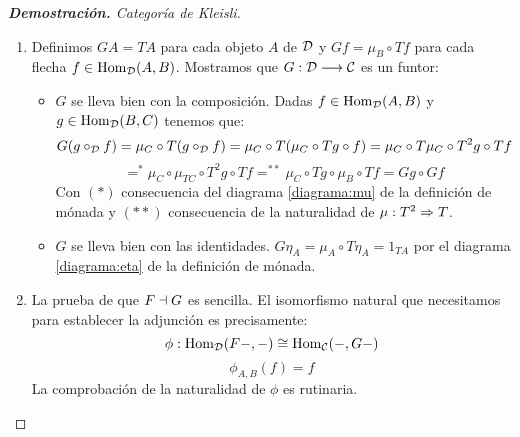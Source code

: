 \begin{proof}[\textbf{Demostración. } Categoría de Kleisli]
\begin{enumerate}
  \item Definimos $GA = TA$ para cada objeto $A$ de $\mathcal{D}$
    y $Gf = \mu_B \circ Tf$ para cada flecha $f \in \operatorname{Hom}_{\mathcal{D}}(A, B)$.
    Mostramos que $G: \mathcal{D}\longrightarrow \mathcal{C}$ es un funtor:
    \begin{itemize}
    \item $G$ se lleva bien con la composición. Dadas $f \in \operatorname{Hom}_{\mathcal{D}}(A, B)$
      y $g \in \operatorname{Hom}_{\mathcal{D}}(B, C)$ tenemos que:
      $$G(g \circ_{\mathcal{D}} f) = \mu_C \circ T(g \circ_{\mathcal{D}} f)
      = \mu_C \circ T(\mu_C \circ Tg \circ f)
      = \mu_C \circ T\mu_C \circ T^2g \circ Tf$$
      $$=^* \mu_C \circ \mu_{TC} \circ T^2g \circ Tf
      =^{**} \mu_C \circ Tg \circ \mu_B \circ Tf
      = Gg \circ Gf$$
      Con $(*)$ consecuencia del diagrama \eqref{diagrama:mu}
      de la definición de mónada y $(**)$ consecuencia de la
      naturalidad de $\mu : T^2\Rightarrow T$.
    \item $G$ se lleva bien con las identidades.
      $G\eta_A = \mu_A \circ T\eta_A = 1_{TA}$
      por el diagrama \eqref{diagrama:eta} de la definición de mónada.
    \end{itemize}
  \item La prueba de que $F \dashv G$ es sencilla.
    El isomorfismo natural que necesitamos para establecer la
    adjunción es precisamente:
    $$\phi : \operatorname{Hom}_{\mathcal{D}}(F-, -) \cong \operatorname{Hom}_{\mathcal{C}}(-, G-)$$
    $$\phi_{A, B}(f) = f$$
    La comprobación de la naturalidad de $\phi$ es rutinaria.

  \end{enumerate}
\end{proof}
